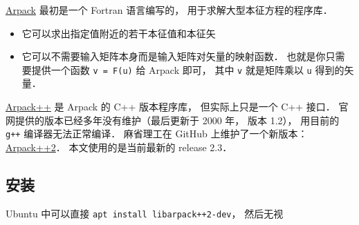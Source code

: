 
\href{https://www.caam.rice.edu/software/ARPACK/}{Arpack} 最初是一个 Fortran 语言编写的， 用于求解大型本征方程的程序库．
\begin{itemize}
\item 它可以求出指定值附近的若干本征值和本征矢
\item 它可以不需要输入矩阵本身而是输入矩阵对矢量的映射函数． 也就是你只需要提供一个函数 \verb|v = F(u)| 给 Arpack 即可， 其中 \verb|v| 就是矩阵乘以 \verb|u| 得到的矢量．
\end{itemize}

\href{http://www.ime.unicamp.br/~chico/arpack++/}{Arpack++} 是 Arpack 的 C++ 版本程序库， 但实际上只是一个 C++ 接口． 官网提供的版本已经多年没有维护（最后更新于 2000 年， 版本 1.2）， 用目前的 \verb|g++| 编译器无法正常编译． 麻省理工在 GitHub 上维护了一个新版本： \href{https://github.com/m-reuter/arpackpp}{Arpack++2}． 本文使用的是当前最新的 release 2.3．

\subsection{安装}
Ubuntu 中可以直接 \verb|apt install libarpack++2-dev|， 然后无视